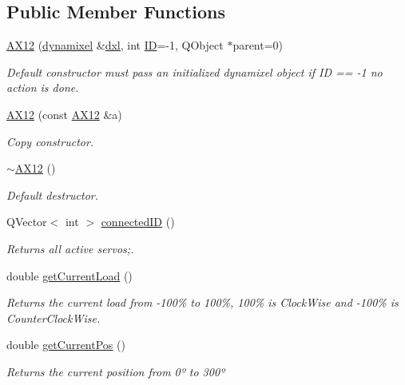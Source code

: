 \subsection*{Public Member Functions}
\begin{DoxyCompactItemize}
\item 
\hyperlink{class_a_x12_a31da599935777b1d8f81b2e014664dbe}{A\+X12} (\hyperlink{classdynamixel}{dynamixel} \&\hyperlink{class_a_x12_a819a7760294ffa2022c5359155d6b51a}{dxl}, int \hyperlink{class_a_x12_a08d272b502d65464202a3aa97825aec0ab2565d5698c9d943a8bcecf02b1389ad}{I\+D}=-\/1, Q\+Object $\ast$parent=0)
\begin{DoxyCompactList}\small\item\em Default constructor must pass an initialized dynamixel object if I\+D == -\/1 no action is done. \end{DoxyCompactList}\item 
\hyperlink{class_a_x12_a37b76666533323ec317f5156dbef2a89}{A\+X12} (const \hyperlink{class_a_x12}{A\+X12} \&a)
\begin{DoxyCompactList}\small\item\em Copy constructor. \end{DoxyCompactList}\item 
\hyperlink{class_a_x12_a5e9382e65479cdcb248f5303ac4c96d9}{$\sim$\+A\+X12} ()
\begin{DoxyCompactList}\small\item\em Default destructor. \end{DoxyCompactList}\item 
Q\+Vector$<$ int $>$ \hyperlink{class_a_x12_a2fa05296aa57896a5cb0ef4ce0aa96f1}{connected\+I\+D} ()
\begin{DoxyCompactList}\small\item\em Returns all active servos;. \end{DoxyCompactList}\item 
double \hyperlink{class_a_x12_a0bd930c81b7a9c088ecab789b3a7e525}{get\+Current\+Load} ()
\begin{DoxyCompactList}\small\item\em Returns the current load from -\/100\% to 100\%, 100\% is Clock\+Wise and -\/100\% is Counter\+Clock\+Wise. \end{DoxyCompactList}\item 
double \hyperlink{class_a_x12_af9722b9c1f82fbfd97fe5e0a44369e8a}{get\+Current\+Pos} ()
\begin{DoxyCompactList}\small\item\em Returns the current position from 0º to 300º \end{DoxyCompactList}\item 

\end{DoxyCompactItemize}
